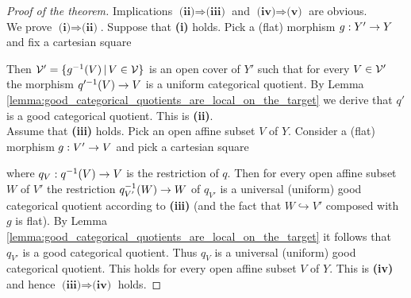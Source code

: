 \begin{proof}[Proof of the theorem]
Implications $\textbf{(ii)}\Rightarrow \textbf{(iii)}$ and $\textbf{(iv)}\Rightarrow \textbf{(v)}$ are obvious.\\
We prove $\textbf{(i)}\Rightarrow \textbf{(ii)}$. Suppose that \textbf{(i)} holds. Pick a (flat) morphism $g:Y'\rightarrow Y$ and fix a cartesian square
\begin{center}
\end{center}
Then ${\mathcal V}' = \{g^{-1}(V)\,|\,V\in {\mathcal V}\}$ is an open cover of $Y'$ such that for every $V\in {\mathcal V}'$ the morphism $q'^{-1}(V)\rightarrow V$ is a uniform categorical quotient. By Lemma \ref{lemma:good_categorical_quotients_are_local_on_the_target} we derive that $q'$ is a good categorical quotient. This is \textbf{(ii)}.\\
Assume that \textbf{(iii)} holds. Pick an open affine subset $V$ of $Y$. Consider a (flat) morphism $g:V'\rightarrow V$ and pick a cartesian square 
\begin{center}
\end{center} 
where $q_V:q^{-1}(V)\rightarrow V$ is the restriction of $q$. Then for every open affine subset $W$ of $V'$ the restriction ${q}_{V'}^{-1}(W)\rightarrow W$ of $q_{V'}$ is a universal (uniform) good categorical quotient according to \textbf{(iii)} (and the fact that $W\hookrightarrow V'$ composed with $g$ is flat). By Lemma \ref{lemma:good_categorical_quotients_are_local_on_the_target} it follows that $q_{V'}$ is a good categorical quotient. Thus $q_V$ is a universal (uniform) good categorical quotient. This holds for every open affine subset $V$ of $Y$. This is \textbf{(iv)} and hence $\textbf{(iii)}\Rightarrow \textbf{(iv)}$ holds.
\end{proof}


